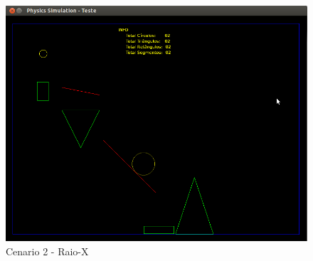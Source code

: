   \begin{figure}[H]
	  \centering
	  \caption{Cenario 2 - Raio-X}
    \includegraphics[scale=0.4]{images/cenario-todosE.png}
  \end{figure}

